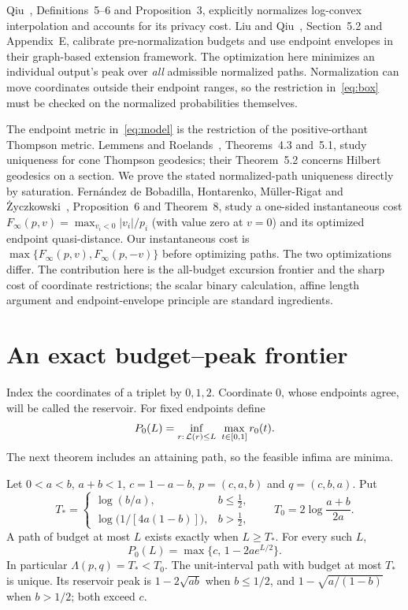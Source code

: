 Qiu~\cite{Qiu26}, Definitions~5--6 and Proposition~3, explicitly normalizes log-convex interpolation and accounts for its privacy cost. Liu and Qiu~\cite{LQ26}, Section~5.2 and Appendix~E, calibrate pre-normalization budgets and use endpoint envelopes in their graph-based extension framework. The optimization here minimizes an individual output's peak over \emph{all} admissible normalized paths. Normalization can move coordinates outside their endpoint ranges, so the restriction in~\eqref{eq:box} must be checked on the normalized probabilities themselves.

The endpoint metric in~\eqref{eq:model} is the restriction of the positive-orthant Thompson metric. Lemmens and Roelands~\cite{LR15}, Theorems~4.3 and~5.1, study uniqueness for cone Thompson geodesics; their Theorem~5.2 concerns Hilbert geodesics on a section. We prove the stated normalized-path uniqueness directly by saturation. Fern\'andez de Bobadilla, Hontarenko, M\"uller-Rigat and \.{Z}yczkowski~\cite{FHMZ26}, Proposition~6 and Theorem~8, study a one-sided instantaneous cost
$F_\infty(p,v)=\max_{v_i<0}|v_i|/p_i$ (with value zero at $v=0$) and its optimized endpoint quasi-distance. Our instantaneous cost is $\max\{F_\infty(p,v),F_\infty(p,-v)\}$ before optimizing paths. The two optimizations differ. The contribution here is the all-budget excursion frontier and the sharp cost of coordinate restrictions; the scalar binary calculation, affine length argument and endpoint-envelope principle are standard ingredients.

\section{An exact budget--peak frontier}
Index the coordinates of a triplet by $0,1,2$. Coordinate $0$, whose endpoints agree, will be called the reservoir. For fixed endpoints define
\[
 P_0(L)=\inf_{r:\,\cost(r)\le L}\ \max_{t\in[0,1]}r_0(t).
\]
The next theorem includes an attaining path, so the feasible infima are minima.

\begin{theorem}\label{thm:frontier}
Let $0<a<b$, $a+b<1$, $c=1-a-b$, $p=(c,a,b)$ and $q=(c,b,a)$. Put
\begin{equation}\label{eq:thresholds}
 T_* =\begin{cases}
 \log(b/a),& b\le\tfrac12,\\
 \log\!\bigl(1/[4a(1-b)]\bigr),& b>\tfrac12,
 \end{cases}
 \qquad T_0=2\log\frac{a+b}{2a}.
\end{equation}
A path of budget at most $L$ exists exactly when $L\ge T_*$. For every such $L$,
\begin{equation}\label{eq:frontier}
 P_0(L)=\max\{c,\,1-2a e^{L/2}\}.
\end{equation}
In particular $\Lambda(p,q)=T_*<T_0$. The unit-interval path with budget at most $T_*$ is unique. Its reservoir peak is $1-2\sqrt{ab}$ when $b\le1/2$, and $1-\sqrt{a/(1-b)}$ when $b>1/2$; both exceed $c$.
\end{theorem}


